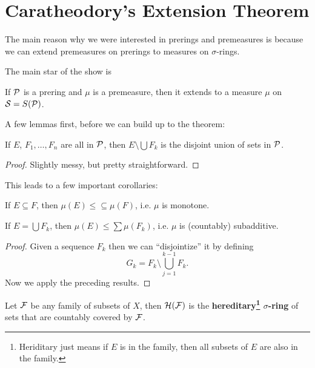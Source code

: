 \section{Caratheodory's Extension Theorem}

The main reason why we were interested in prerings and premeasures is because we can extend premeasures on prerings to measures on $\sigma$-rings.

The main star of the show is

\begin{theorem}
    If $\mathcal P$ is a prering and $\mu$ is a premeasure, then it extends to a measure $\mu$ on $\mathcal S = S(\mathcal P)$.
\end{theorem}

A few lemmas first, before we can build up to the theorem:

\begin{lemma}
    If $E$, $F_1, \dots, F_n$ are all in $\mathcal P$, then $E \setminus \bigcup F_k$ is the disjoint union of sets in $\mathcal P$.
\end{lemma}

\begin{proof}
    Slightly messy, but pretty straightforward.
\end{proof}

This leads to a few important corollaries:

\begin{corollary}
    If $E \subseteq F$, then $\mu(E) \le \subseteq \mu(F)$, i.e. $\mu$ is monotone.
\end{corollary}

\begin{corollary}
    If $E = \bigcup F_k$, then $\mu(E) \le \sum \mu(F_k)$, i.e. $\mu$ is (countably) subadditive.
\end{corollary}

\begin{proof}
    Given a sequence $F_k$ then we can ``disjointize'' it by defining \[G_k = F_k \setminus \bigcup_{j = 1}^{k - 1}F_k.\] Now we apply the preceding results.
\end{proof}

\begin{definition}
    Let $\mathcal F$ be any family of subsets of $X$, then $\mathcal H(\mathcal F)$ is the \textbf{hereditary\footnote{Heriditary just means if $E$ is in the family, then all subsets of $E$ are also in the family.} $\sigma$-ring} of sets that are countably covered by $\mathcal F$.
\end{definition}

